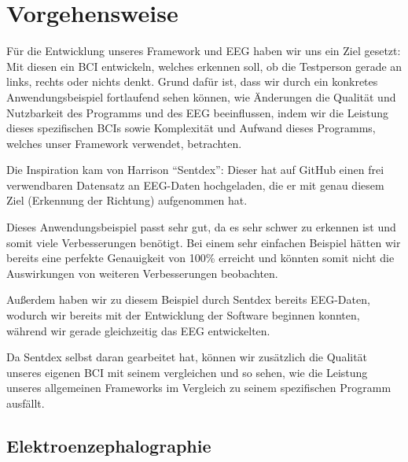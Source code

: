 \documentclass[10pt]{article}
\begin{document}
\section{Vorgehensweise}

Für die Entwicklung unseres Framework und EEG haben wir uns ein Ziel gesetzt: Mit diesen ein BCI entwickeln, welches erkennen soll, ob die Testperson gerade an links, rechts oder nichts denkt.
Grund dafür ist, dass wir durch ein konkretes Anwendungsbeispiel fortlaufend sehen können, wie Änderungen die Qualität und Nutzbarkeit des Programms und des EEG beeinflussen, indem wir die Leistung dieses spezifischen BCIs sowie Komplexität und Aufwand dieses Programms, welches unser Framework verwendet, betrachten.

Die Inspiration kam von Harrison \enquote{Sentdex}: Dieser hat auf GitHub einen frei verwendbaren Datensatz an EEG-Daten hochgeladen, die er mit genau diesem Ziel (Erkennung der Richtung) aufgenommen hat. \cite{Sentdex}

Dieses Anwendungsbeispiel passt sehr gut, da es sehr schwer zu erkennen ist und somit viele Verbesserungen benötigt.
Bei einem sehr einfachen Beispiel hätten wir bereits eine perfekte Genauigkeit von 100\% erreicht und könnten somit nicht die Auswirkungen von weiteren Verbesserungen beobachten.

Außerdem haben wir zu diesem Beispiel durch Sentdex bereits EEG-Daten, wodurch wir bereits mit der Entwicklung der Software beginnen konnten, während wir gerade gleichzeitig das EEG entwickelten.

Da Sentdex selbst daran gearbeitet hat, können wir zusätzlich die Qualität unseres eigenen BCI mit seinem vergleichen und so sehen, wie die Leistung unseres allgemeinen Frameworks im Vergleich zu seinem spezifischen Programm ausfällt. 



\subsection{Elektroenzephalographie}
\end{document}
